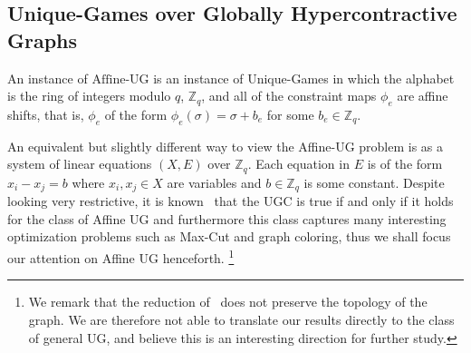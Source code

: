 \subsection{Unique-Games over Globally Hypercontractive Graphs}
\begin{definition}
An instance of $\text{Affine-UG}$ is an instance of Unique-Games 
in which the alphabet is the ring of integers modulo $q$, $\mathbb{Z}_q$, and all of the 
constraint maps $\phi_e$ are affine shifts, that is, $\phi_e$ 
of the form $\phi_e(\sigma) = \sigma+b_e$ for some $b_e\in\mathbb{Z}_q$.
\end{definition}
An equivalent but slightly different way to view 
the Affine-UG problem is as a system
of linear equations $(X,E)$ over $\mathbb{Z}_q$.  
Each equation in $E$ is of the form $x_i - x_j = b$ where $x_i,x_j\in X$ are variables 
and $b\in\mathbb{Z}_q$ is some constant. Despite looking very restrictive, 
it is known~\cite{KhotKMO07} that the UGC is true if and 
only if it holds for the class of Affine UG and furthermore this class captures many interesting optimization problems such as Max-Cut and graph coloring, thus we shall focus our attention on Affine UG henceforth. 
\footnote{We remark that the 
reduction of~\cite{KhotKMO07} does not preserve the topology of the graph. 
We are therefore not able to translate our results directly to the 
class of general UG, and believe this is an interesting direction 
for further study.}

